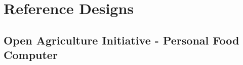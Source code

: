 \documentclass{report}
\begin{document}
\newpage

\section{Reference Designs}


\subsection{Open Agriculture Initiative - Personal Food Computer}



\newpage



\end{document}
